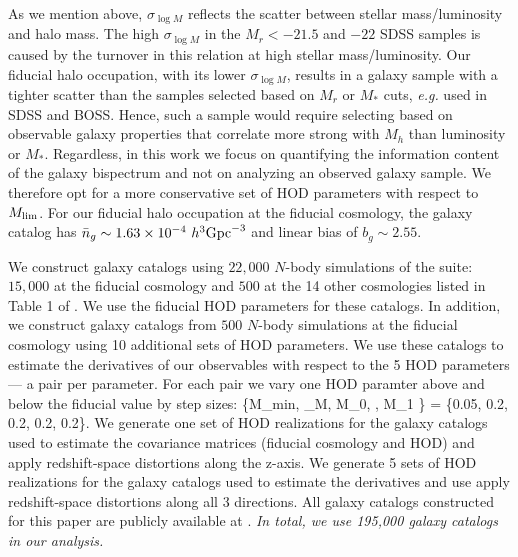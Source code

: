 As we mention above, $\sigma_{\log M}$ reflects the scatter between stellar 
mass/luminosity and halo mass. The high $\sigma_{\log M}$ in the $M_r < -21.5$ 
and $-22$ SDSS samples is caused by the turnover in this relation at high stellar 
mass/luminosity. Our fiducial halo occupation, with its lower $\sigma_{\log M}$, 
results in a galaxy sample with a tighter scatter than the samples selected based 
on $M_r$ or $M_*$ cuts, \emph{e.g.} used in SDSS and BOSS. Hence, such a sample
would require selecting based on observable galaxy properties that correlate 
more strong with $M_h$ than luminosity or $M_*$.  Regardless, in this work
we focus on quantifying the information content of the galaxy bispectrum 
and not on analyzing an observed galaxy sample. We therefore opt for a more 
conservative set of HOD parameters with respect to $M_{\rm lim}$. For our
fiducial halo occupation at the fiducial cosmology, the galaxy catalog has 
$\bar{n}_g \sim 1.63\times 10^{-4}~h^3{\rm Gpc}^{-3}$ and linear bias of 
$b_g \sim 2.55$.

We construct galaxy catalogs using $22,000$ $N$-body simulations of the \quij
suite: $15,000$ at the fiducial cosmology and $500$ at the 14 other cosmologies
listed in Table 1 of \cite{hahn2019}. We use the fiducial HOD parameters for
these catalogs. In addition, we construct galaxy catalogs from $500$ $N$-body
simulations at the fiducial cosmology using 10 additional sets of HOD
parameters. We use these catalogs to estimate the derivatives of our observables
with respect to the 5 HOD parameters --- a pair per parameter. For each pair we
vary one HOD paramter above and below the fiducial value by step sizes: 
\beq
\{\Delta M_{\rm min}, \Delta \sigma_{\log M}, \Delta \log M_0, \Delta \alpha,
\Delta \log M_1 \} = \{0.05, 0.2, 0.2, 0.2, 0.2\}.
\eeq
We generate one set of
HOD realizations for the galaxy catalogs used to estimate the covariance matrices
(fiducial cosmology and HOD) and apply redshift-space distortions along the
z-axis. We generate 5 sets of HOD realizations for the galaxy catalogs used to
estimate the derivatives and use apply redshift-space distortions along all
3 directions. All galaxy catalogs constructed for this paper are publicly available
at .
{\em In total, we use 195,000 galaxy catalogs in our analysis.}
